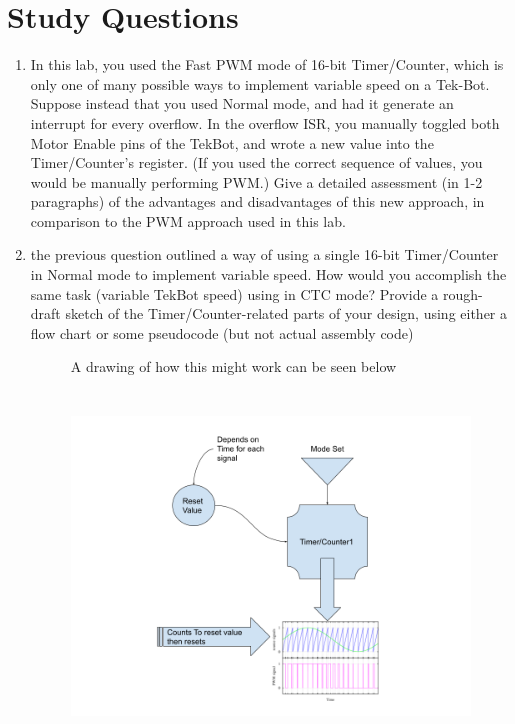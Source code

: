 \documentclass[12pt,letterpaper]{article}
\begin{document}
\section{Study Questions}
\begin{enumerate}
    \item
    In this lab, you used the Fast PWM mode of 16-bit Timer/Counter, which is only one of many possible ways to implement variable speed on a Tek-Bot. Suppose instead that you used Normal mode, and had it generate an interrupt for every overflow. In the overflow ISR, you manually toggled both Motor Enable pins of the TekBot, and wrote a new value into the Timer/Counter’s register. (If you used the correct sequence of values, you would be manually performing PWM.) Give a detailed assessment (in 1-2 paragraphs) of the advantages and disadvantages of this new approach, in comparison to the PWM approach used in this lab.
    
    
    \item 
    the previous question outlined a way of using a single 16-bit Timer/Counter in Normal mode to implement variable speed. How would you accomplish the same task (variable TekBot speed) using in CTC mode? Provide a rough-draft sketch of the Timer/Counter-related parts of your design, using either a flow chart or some pseudocode (but not actual assembly code)
    
    \begin{figure}[h]
    	 A drawing of how this might work can be seen below
    	\includegraphics[width=12cm, height=10cm]{q2Drawing.png}
    	\centering
    \end{figure}
   

\end{enumerate}
\end{document}
